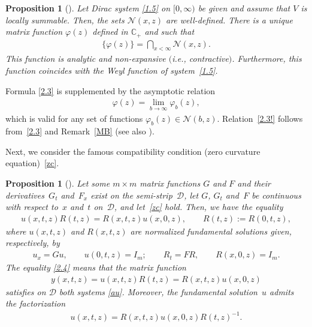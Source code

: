 \documentclass[pdftex]{sigma}
\newtheorem{Proposition}[Theorem]{Proposition}
{\theoremstyle{definition}
\newtheorem{Definition}[Theorem]{Definition}
\newtheorem{Notation}[Theorem]{Notation}
\newtheorem{Example}[Theorem]{Example}
\newtheorem{Remark}[Theorem]{Remark}
}
\def\vp{\varphi}
\def\BC{{\mathbb C}}
\def\cln{{\mathcal N}}
\newcommand{\cD}{{\mathcal D}}
\numberwithin{equation}{section}
\begin{document}
 \begin{Proposition}[\cite{FKRSp1}] \label{PnW1} Let Dirac system \eqref{1.5} on $[0, \infty)$
 be given and assume that $V$ is locally summable.
 Then, the sets $\cln(x,z)$
 are well-defined. There is a unique matrix function
 $\vp(z)$ defined in $\BC_+$ and such that
\begin{gather}  \label{2.3}
\{\vp(z) \}=\bigcap_{x<\infty}\cln(x,z).
\end{gather}
This function is analytic and non-expansive $($i.e., contractive$)$.
Furthermore, this function coincides with the Weyl function of system~\eqref{1.5}.
 \end{Proposition}

Formula \eqref{2.3} is supplemented by the asymptotic relation
\begin{gather}  \label{2.3!}
\vp(z)=\lim_{b \to \infty}\vp_b(z),
\end{gather}
which is valid for any set of functions $\vp_b(z)\in \cln(b,z)$. Relation~\eqref{2.3!} follows from~\eqref{2.3}
and Remark~\ref{MB} (see also \cite[Remark~2.24]{SaSaR}).

Next, we consider the famous compatibility condition (zero curvature equation)~\eqref{zc}.
\begin{Proposition}[\cite{SaAF}] \label{TmM}
Let some $m \times m$ matrix functions $G$ and $F$ and their derivatives~$G_t$ and~$F_x$ exist on the semi-strip~$\cD$,
let $G$, $G_t$ and~$F$ be continuous with respect to~$x$ and~$t$ on~$\mathcal{D}$,
 and let~\eqref{zc}
hold. Then, we have the equality
\begin{gather} \label{2.4}
u(x,t,z)R(t,z)=R(x,t,z)u(x,0,z), \qquad R(t,z):=R(0,t,z),
\end{gather}
where $u(x,t,z)$ and $R(x,t,z)$ are normalized fundamental solutions given, respectively, by
\begin{gather} \label{2.5}
u_x=Gu, \qquad u(0,t,z)=I_m; \qquad R_t=FR, \qquad R(x,0,z)=I_m.
\end{gather}
The equality \eqref{2.4} means that the matrix function
\begin{gather*}
y(x,t,z)=u(x,t,z)R(t,z)=R(x,t,z)u(x,0,z)
\end{gather*}
satisf\/ies on $\cD$ both systems \eqref{au}. Moreover, the fundamental solution~$u$ admits the factorization
\begin{gather} \label{2.6}
u(x,t,z)=R(x,t,z)u(x,0,z)R(t,z)^{-1}.
\end{gather}
\end{Proposition}
\end{document}

